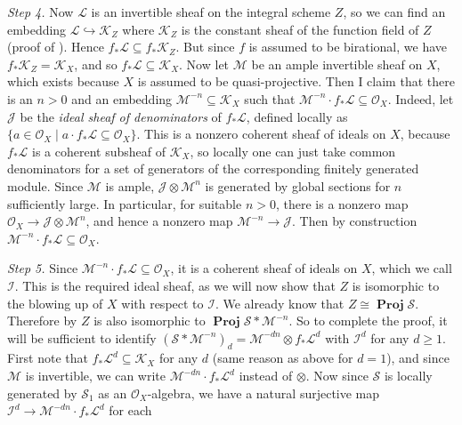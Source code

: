 {\hypertarget{step-II-7.17-4}{}\emph{Step 4.} Now $\mathcal L$ is an invertible sheaf on the integral scheme $Z$, so we can find an embedding $\mathcal L\hookrightarrow\mathcal K_Z$ where $\mathcal K_Z$ is the constant sheaf of the function field of $Z$ (proof of ). Hence $f_*\mathcal L\subseteq f_*\mathcal K_Z$. But since $f$ is assumed to be birational, we have $f_*\mathcal K_Z=\mathcal K_X$, and so $f_*\mathcal L\subseteq\mathcal K_X$. Now let $\mathcal M$ be an ample invertible sheaf on $X$, which exists because $X$ is assumed to be quasi-projective. Then I claim that there is an $n>0$ and an embedding $\mathcal M^{-n}\subseteq\mathcal K_X$ such that $\mathcal M^{-n}\cdot f_*\mathcal L\subseteq\mathcal O_X$. Indeed, let $\mathcal J$ be the \emph{ideal sheaf of denominators} of $f_*\mathcal L$, defined locally as $\{a\in\mathcal O_X\mid a\cdot f_*\mathcal L\subseteq\mathcal O_X\}$. This is a nonzero coherent sheaf of ideals on $X$, because $f_*\mathcal L$ is a coherent subsheaf of $\mathcal K_X$, so locally one can just take common denominators for a set of generators of the corresponding finitely generated module. Since $\mathcal M$ is ample, $\mathcal J\otimes\mathcal M^n$ is generated by global sections for $n$ sufficiently large. In particular, for suitable $n>0$, there is a nonzero map $\mathcal O_X\to\mathcal J\otimes\mathcal M^n$, and hence a nonzero map $\mathcal M^{-n}\to\mathcal J$. Then by construction $\mathcal M^{-n}\cdot f_*\mathcal L\subseteq\mathcal O_X$.

\hypertarget{step-II-7.17-5}{}\emph{Step 5.} Since $\mathcal M^{-n}\cdot f_*\mathcal L\subseteq\mathcal O_X$, it is a coherent sheaf of ideals on $X$, which we call $\mathcal I$. This is the required ideal sheaf, as we will now show that $Z$ is isomorphic to the blowing up of $X$ with respect to $\mathcal I$. We already know that $Z\cong\operatorname{\mathbf{Proj}}\mathcal S$. Therefore by  $Z$ is also isomorphic to $\operatorname{\mathbf{Proj}}\mathcal S*\mathcal M^{-n}$. So to complete the proof, it will be sufficient to identify $(\mathcal S*\mathcal M^{-n})_d=\mathcal M^{-dn}\otimes f_*\mathcal L^d$ with $\mathcal I^d$ for any $d\geq1$. First note that $f_*\mathcal L^d\subseteq\mathcal K_X$ for any $d$ (same reason as above for $d=1$), and since $\mathcal M$ is invertible, we can write $\mathcal M^{-dn}\cdot f_*\mathcal L^d$ instead of $\otimes$. Now since $\mathcal S$ is locally generated by $\mathcal S_1$ as an $\mathcal O_X$-algebra, we have a natural surjective map $\mathcal I^d\to\mathcal M^{-dn}\cdot f_*\mathcal L^d$ for each
}
